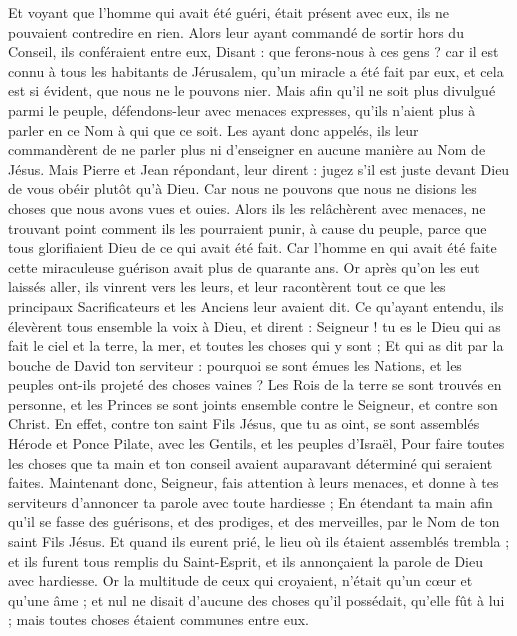 \begin{multicols}{2}
Et voyant que l'homme qui avait été guéri, était présent avec eux, ils ne pouvaient contredire en rien.
Alors leur ayant commandé de sortir hors du Conseil, ils conféraient entre eux,
Disant : que ferons-nous à ces gens ? car il est connu à tous les habitants de Jérusalem, qu'un miracle a été fait par eux, et cela est si évident, que nous ne le pouvons nier.
Mais afin qu'il ne soit plus divulgué parmi le peuple, défendons-leur avec menaces expresses, qu'ils n'aient plus à parler en ce Nom à qui que ce soit.
Les ayant donc appelés, ils leur commandèrent de ne parler plus ni d'enseigner en aucune manière au Nom de Jésus.
Mais Pierre et Jean répondant, leur dirent : jugez s'il est juste devant Dieu de vous obéir plutôt qu'à Dieu.
Car nous ne pouvons que nous ne disions les choses que nous avons vues et ouies.
Alors ils les relâchèrent avec menaces, ne trouvant point comment ils les pourraient punir, à cause du peuple, parce que tous glorifiaient Dieu de ce qui avait été fait.
Car l'homme en qui avait été faite cette miraculeuse guérison avait plus de quarante ans.
Or après qu'on les eut laissés aller, ils vinrent vers les leurs, et leur racontèrent tout ce que les principaux Sacrificateurs et les Anciens leur avaient dit.
Ce qu'ayant entendu, ils élevèrent tous ensemble la voix à Dieu, et dirent : Seigneur ! tu es le Dieu qui as fait le ciel et la terre, la mer, et toutes les choses qui y sont ;
Et qui as dit par la bouche de David ton serviteur : pourquoi se sont émues les Nations, et les peuples ont-ils projeté des choses vaines ?
Les Rois de la terre se sont trouvés en personne, et les Princes se sont joints ensemble contre le Seigneur, et contre son Christ.
En effet, contre ton saint Fils Jésus, que tu as oint, se sont assemblés Hérode et Ponce Pilate, avec les Gentils, et les peuples d'Israël,
Pour faire toutes les choses que ta main et ton conseil avaient auparavant déterminé qui seraient faites.
Maintenant donc, Seigneur, fais attention à leurs menaces, et donne à tes serviteurs d'annoncer ta parole avec toute hardiesse ;
En étendant ta main afin qu'il se fasse des guérisons, et des prodiges, et des merveilles, par le Nom de ton saint Fils Jésus.
Et quand ils eurent prié, le lieu où ils étaient assemblés trembla ; et ils furent tous remplis du Saint-Esprit, et ils annonçaient la parole de Dieu avec hardiesse.
Or la multitude de ceux qui croyaient, n'était qu'un cœur et qu'une âme ; et nul ne disait d'aucune des choses qu'il possédait, qu'elle fût à lui ; mais toutes choses étaient communes entre eux.

\end{multicols}
